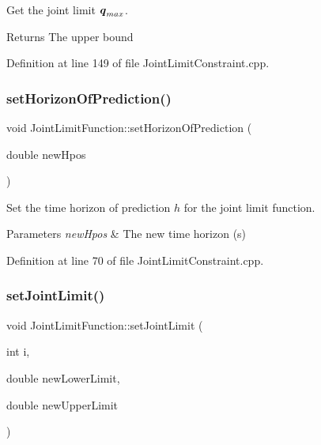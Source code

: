 Get the joint limit $ \mbox{\boldmath${q}$}_{max} $.

\begin{DoxyReturn}{Returns}
The upper bound 
\end{DoxyReturn}


Definition at line 149 of file Joint\+Limit\+Constraint.\+cpp.

\hypertarget{classocra_1_1JointLimitFunction_a02dfaf445e997387b2fd915bc398dc73}{}\label{classocra_1_1JointLimitFunction_a02dfaf445e997387b2fd915bc398dc73} 
\subsubsection{\texorpdfstring{set\+Horizon\+Of\+Prediction()}{setHorizonOfPrediction()}}
{\footnotesize\ttfamily void Joint\+Limit\+Function\+::set\+Horizon\+Of\+Prediction (\begin{DoxyParamCaption}\item[{double}]{new\+Hpos }\end{DoxyParamCaption})}

Set the time horizon of prediction $ h $ for the joint limit function.


\begin{DoxyParams}{Parameters}
{\em new\+Hpos} & The new time horizon (s) \\
\hline
\end{DoxyParams}


Definition at line 70 of file Joint\+Limit\+Constraint.\+cpp.

\hypertarget{classocra_1_1JointLimitFunction_a41432c4d8d08c17e90892a26963d3d5e}{}\label{classocra_1_1JointLimitFunction_a41432c4d8d08c17e90892a26963d3d5e} 
\subsubsection{\texorpdfstring{set\+Joint\+Limit()}{setJointLimit()}}
{\footnotesize\ttfamily void Joint\+Limit\+Function\+::set\+Joint\+Limit (\begin{DoxyParamCaption}\item[{int}]{i,  }\item[{double}]{new\+Lower\+Limit,  }\item[{double}]{new\+Upper\+Limit }\end{DoxyParamCaption})}

